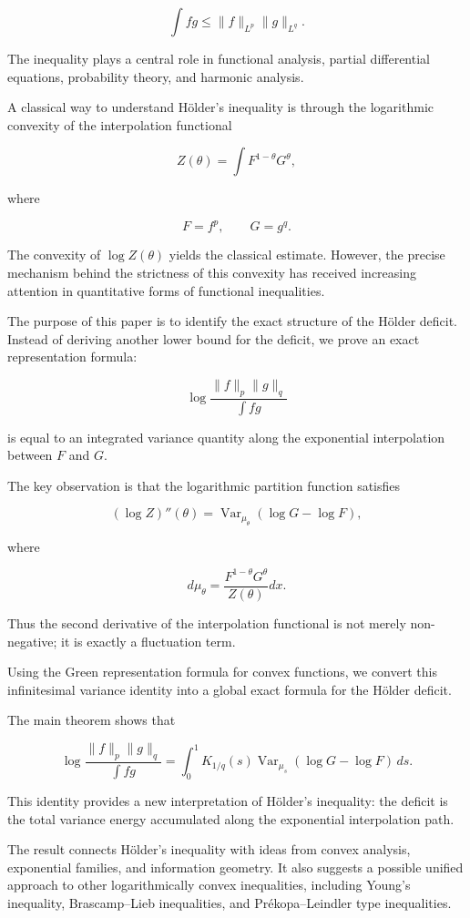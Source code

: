 \documentclass[11pt]{amsart}
\begin{document}
\[
\int fg
\leq
\|f\|_{L^p}
\|g\|_{L^q}.
\]

The inequality plays a central role in functional analysis,
partial differential equations, probability theory, and harmonic
analysis.

A classical way to understand Hölder's inequality is through the
logarithmic convexity of the interpolation functional

\[
Z(\theta)
=
\int
F^{1-\theta}G^\theta ,
\]

where

\[
F=f^p,
\qquad
G=g^q .
\]

The convexity of $\log Z(\theta)$ yields the classical estimate.
However, the precise mechanism behind the strictness of this
convexity has received increasing attention in quantitative forms
of functional inequalities.

The purpose of this paper is to identify the exact structure of
the Hölder deficit. Instead of deriving another lower bound for
the deficit, we prove an exact representation formula:

\[
\log
\frac{
\|f\|_p\|g\|_q
}{
\int fg
}
\]

is equal to an integrated variance quantity along the exponential
interpolation between $F$ and $G$.

The key observation is that the logarithmic partition function
satisfies

\[
(\log Z)''(\theta)
=
\operatorname{Var}_{\mu_\theta}
(\log G-\log F),
\]

where

\[
d\mu_\theta
=
\frac{
F^{1-\theta}G^\theta
}{
Z(\theta)
}
dx .
\]

Thus the second derivative of the interpolation functional is not
merely non-negative; it is exactly a fluctuation term.

Using the Green representation formula for convex functions, we
convert this infinitesimal variance identity into a global exact
formula for the Hölder deficit.


The main theorem shows that

\[
\boxed{
\log
\frac{
\|f\|_p\|g\|_q
}{
\int fg
}
=
\int_0^1
K_{1/q}(s)
\operatorname{Var}_{\mu_s}
(\log G-\log F)
\,ds .
}
\]

This identity provides a new interpretation of Hölder's inequality:
the deficit is the total variance energy accumulated along the
exponential interpolation path.

The result connects Hölder's inequality with ideas from convex
analysis, exponential families, and information geometry.
It also suggests a possible unified approach to other logarithmically
convex inequalities, including Young's inequality,
Brascamp--Lieb inequalities, and Prékopa--Leindler type inequalities.
\end{document}
